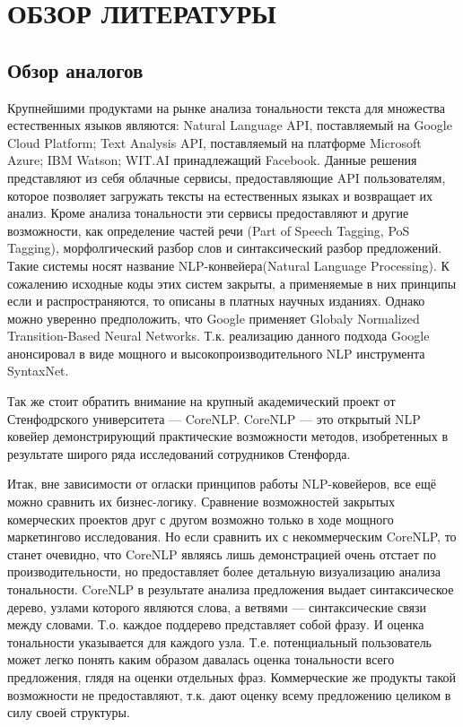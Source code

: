\section{ОБЗОР ЛИТЕРАТУРЫ}\label{sec:overview}
\subsection{Обзор аналогов}\label{subsec:overview:overview_analogue}
Крупнейшими продуктами на рынке анализа тональности текста для множества естественных языков являются: Natural Language API, поставляемый на Google Cloud Platform; Text Analysis API, поставляемый на платформе Microsoft Azure; IBM Watson; WIT.AI принадлежащий Facebook. Данные решения представляют из себя облачные сервисы, предоставляющие API пользователям, которое позволяет загружать тексты на естественных языках и возвращает их анализ. Кроме анализа тональности эти сервисы предоставляют и другие возможности, как определение частей речи (Part of Speech Tagging, PoS Tagging), морфолгический разбор слов и синтаксический разбор предложений. Такие системы носят название NLP-конвейера(Natural Language Processing). К сожалению исходные коды этих систем закрыты, а применяемые в них принципы если и распространяются, то описаны в платных научных изданиях. Однако можно уверенно предположить, что Google применяет Globaly Normalized Transition-Based Neural Networks\cite{google_gntb}. Т.к. реализацию  данного подхода Google анонсировал в виде мощного и высокопроизводительного NLP инструмента SyntaxNet.

Так же стоит обратить внимание на крупный академический проект от Стенфодрского университета --- CoreNLP. CoreNLP --- это открытый NLP ковейер демонстрирующий практические возможности методов, изобретенных в результате широго ряда исследований сотрудников Стенфорда.

Итак, вне зависимости от огласки принципов работы NLP-ковейеров, все ещё можно сравнить их бизнес-логику. Сравнение возможностей закрытых комерческих проектов друг с другом возможно только в ходе мощного маркетингово исследования. Но если сравнить их с некоммерческим CoreNLP, то станет очевидно, что CoreNLP являясь лишь демонстрацией очень отстает по производительности, но предоставляет более детальную визуализацию анализа тональности. CoreNLP в результате анализа предложения выдает синтаксическое дерево, узлами которого являются слова, а ветвями --- синтаксические связи между словами. Т.о. каждое поддерево представляет собой фразу. И оценка тональности указывается для каждого узла. Т.е. потенциальный пользователь может легко понять каким образом давалась оценка тональности всего предложения, глядя на оценки отдельных фраз. Коммерческие же продукты такой возможности не предоставляют, т.к. дают оценку всему предложению целиком в силу своей структуры.
